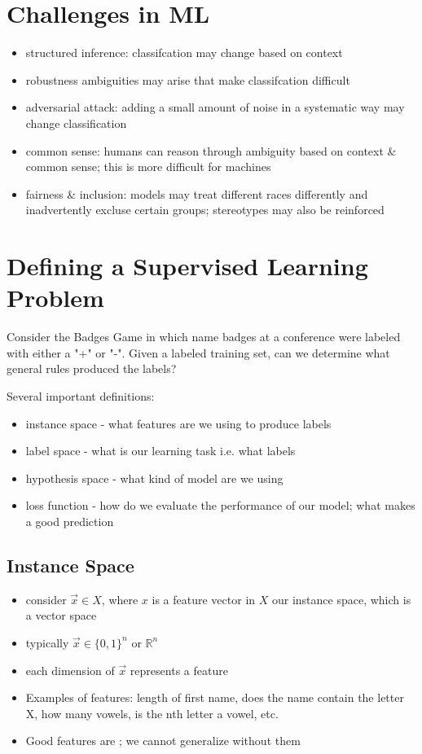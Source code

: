 \section*{Challenges in ML}
\begin{itemize}
    \item structured inference: classifcation may change based on context
    \item robustness ambiguities may arise that make classifcation difficult
    \item adversarial attack: adding a small amount of noise in a systematic way may change classification 
    \item common sense: humans can reason through ambiguity based on context \& common sense; this is more difficult for machines
    \item fairness \& inclusion: models may treat different races differently and inadvertently excluse certain groups; stereotypes may also be reinforced
\end{itemize}

\section*{Defining a Supervised Learning Problem}

Consider the Badges Game in which name badges at a conference were labeled with either a "+" or "-". Given a labeled training set, can we determine what general rules produced the labels?

Several important definitions:
\begin{itemize}
    \item instance space - what features are we using to produce labels
    \item label space - what is our learning task i.e. what labels
    \item hypothesis space - what kind of model are we using
    \item loss function - how do we evaluate the performance of our model; what makes a good prediction
\end{itemize}

\subsection*{Instance Space}
\begin{itemize}
    \item consider $\vec{x} \in X$, where $x$ is a feature vector in $X$ our instance space, which is a vector space
    \item typically $\vec{x} \in \{0,1\}^n$ or $\mathbb{R}^n$
    \item each dimension of $\vec{x}$ represents a feature
    \item Examples of features: length of first name, does the name contain the letter X, how many vowels, is the nth letter a vowel, etc.
    \item Good features are ; we cannot generalize without them
\end{itemize}

